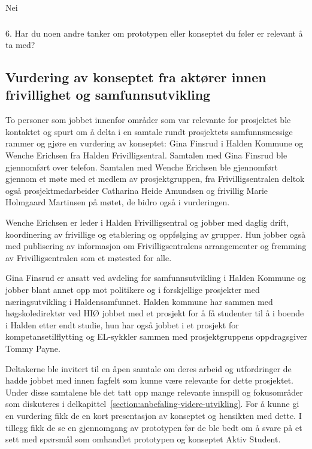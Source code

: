 Nei

\subsubsection{}{6. Har du noen andre tanker om prototypen eller konseptet du føler er relevant å ta med?}


\subsection{Vurdering av konseptet fra aktører innen frivillighet og samfunnsutvikling}
To personer som jobbet innenfor områder som var relevante for prosjektet ble kontaktet og spurt om å delta i en samtale rundt prosjektets samfunnsmessige rammer og gjøre en vurdering av konseptet: Gina Finsrud i Halden Kommune og Wenche Erichsen fra Halden Frivilligsentral. Samtalen med Gina Finsrud ble gjennomført over telefon. Samtalen med Wenche Erichsen ble gjennomført gjennom et møte med et medlem av prosjektgruppen, fra Frivilligsentralen deltok også prosjektmedarbeider Catharina Heide Amundsen og frivillig Marie Holmgaard Martinsen på møtet, de bidro også i vurderingen.

Wenche Erichsen er leder i Halden Frivilligsentral og jobber med daglig drift, koordinering av frivillige og etablering og oppfølging av grupper. Hun jobber også med publisering av informasjon om Frivilligsentralens arrangementer og fremming av Frivilligsentralen som et møtested for alle. \cite{FRIVILLIGSENTRALEN-INTERVJU:21} 

Gina Finsrud er ansatt ved avdeling for samfunnsutvikling i Halden Kommune og jobber blant annet opp mot politikere og i forskjellige prosjekter med næringsutvikling i Haldensamfunnet. Halden kommune har sammen med høgskoledirektør ved HIØ jobbet med et prosjekt for å få studenter til å i boende i Halden etter endt studie, hun har også jobbet i et prosjekt for kompetansetilflytting og EL-sykkler sammen med prosjektgruppens oppdragsgiver Tommy Payne. \cite{KOMMUNEN-INTERVJU:20} 

Deltakerne ble invitert til en åpen samtale om deres arbeid og utfordringer de hadde jobbet med innen fagfelt som kunne være relevante for dette prosjektet. Under disse samtalene ble det tatt opp mange relevante innspill og fokusområder som diskuteres i delkapittel~\ref{section:anbefaling-videre-utvikling}. For å kunne gi en vurdering fikk de en kort presentasjon av konseptet og hensikten med dette. I tillegg fikk de se en gjennomgang av prototypen før de ble bedt om å svare på et sett med spørsmål som omhandlet prototypen og konseptet Aktiv Student.

